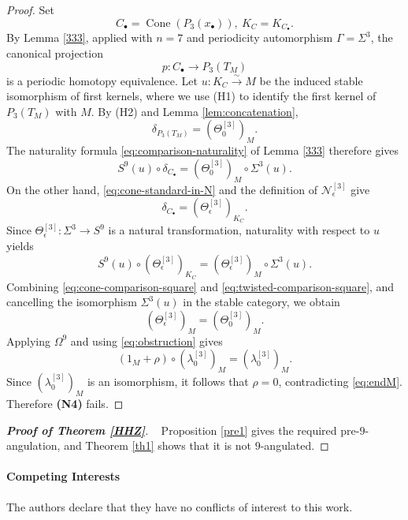 \documentclass[12pt, twoside]{article}
\numberwithin{equation}{section}
\begin{document}
\begin{proof}
Set
\[
C_\bullet=\operatorname{Cone}(P_3(x_\bullet)),
~ K_C=K_{C_\bullet}.
\]
By Lemma \ref{333}, applied with $n=7$ and periodicity automorphism $\Gamma=\Sigma^3$, the canonical projection
\[
p\colon C_\bullet\longrightarrow P_3(T_M)
\]
is a periodic homotopy equivalence. Let
$
u\colon K_C\xrightarrow{\sim}M
$
be the induced stable isomorphism of first kernels, where we use (H1) to identify the first kernel of $P_3(T_M)$ with $M$. By (H2) and Lemma \ref{lem:concatenation},
\begin{equation*}
\delta_{P_3(T_M)}=(\Theta_0^{[3]})_M.
\end{equation*}
The naturality formula \eqref{eq:comparison-naturality} of Lemma \ref{333} therefore gives
\begin{equation}\label{eq:cone-comparison-square}
S^9(u)\circ\delta_{C_\bullet}
=(\Theta_0^{[3]})_M\circ\Sigma^3(u).
\end{equation}
On the other hand, \eqref{eq:cone-standard-in-N} and the definition of $\mathcal N_\epsilon^{[3]}$ give
\[
\delta_{C_\bullet}=(\Theta_\epsilon^{[3]})_{K_C}.
\]
Since $\Theta_\epsilon^{[3]}\colon \Sigma^3\to S^9$ is a natural transformation, naturality with respect to $u$ yields
\begin{equation}\label{eq:twisted-comparison-square}
S^9(u)\circ(\Theta_\epsilon^{[3]})_{K_C}
=(\Theta_\epsilon^{[3]})_M\circ\Sigma^3(u).
\end{equation}
Combining \eqref{eq:cone-comparison-square} and \eqref{eq:twisted-comparison-square}, and cancelling the isomorphism $\Sigma^3(u)$ in the stable category, we obtain
\[
(\Theta_\epsilon^{[3]})_M=(\Theta_0^{[3]})_M.
\]
Applying $\Omega^9$ and using \eqref{eq:obstruction} gives
\[
(1_M+\rho)\circ(\lambda_0^{[3]})_M=(\lambda_0^{[3]})_M.
\]
Since $(\lambda_0^{[3]})_M$ is an isomorphism, it follows that $\rho=0$, contradicting \eqref{eq:endM}. Therefore \textbf{(N4)} fails.
\end{proof}

\begin{proof}[\bf \emph{Proof of Theorem \ref{HHZ}}]~
Proposition \ref{pre1} gives the required pre-$9$-angulation, and Theorem \ref{th1} shows that it is not $9$-angulated.
\end{proof}
\vspace{2mm}

\paragraph{Competing Interests}
The authors declare that they have no conflicts of interest to this work.
\end{document}
